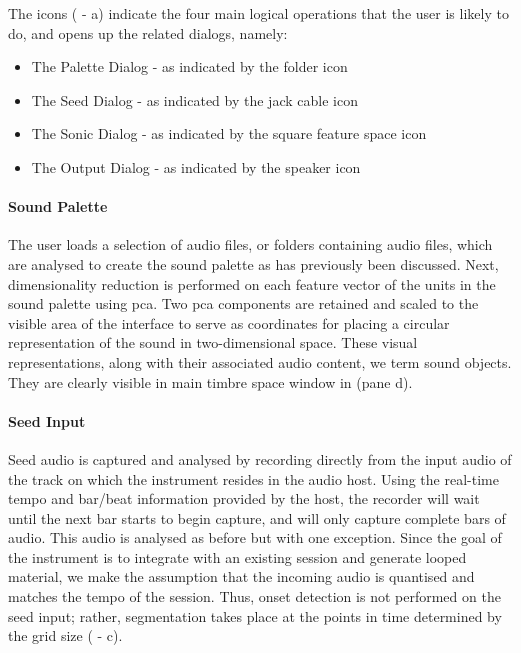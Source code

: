  
The icons ( - a) indicate the four main logical operations that the user is likely to do, and opens up the related dialogs, namely:
\begin{itemize}
  \item The Palette Dialog - as indicated by the folder icon
  \item The Seed Dialog - as indicated by the jack cable icon
  \item The Sonic Dialog - as indicated by the square feature space icon
  \item The Output Dialog - as indicated by the speaker icon
\end{itemize}

\paragraph{Sound Palette}

The user loads a selection of audio files, or folders containing audio files, which are analysed to create the sound palette as has previously been discussed. Next, dimensionality reduction is performed on each feature vector of the units in the sound palette using \acrfull{pca}. Two \acrshort{pca} components are retained and scaled to the visible area of the interface to serve as coordinates for placing a circular representation of the sound in two-dimensional space. These visual representations, along with their associated audio content, we term sound objects. They are clearly visible in main timbre space window in  (pane d).

\paragraph{Seed Input}

Seed audio is captured and analysed by recording directly from the input audio of the track on which the instrument resides in the audio host. Using the real-time tempo and bar/beat information provided by the host, the recorder will wait until the next bar starts to begin capture, and will only capture complete bars of audio. This audio is analysed as before but with one exception. Since the goal of the instrument is to integrate with an existing session and generate looped material, we make the assumption that the incoming audio is quantised and matches the tempo of the session. Thus, onset detection is not performed on the seed input; rather, segmentation takes place at the points in time determined by the grid size ( - c).

